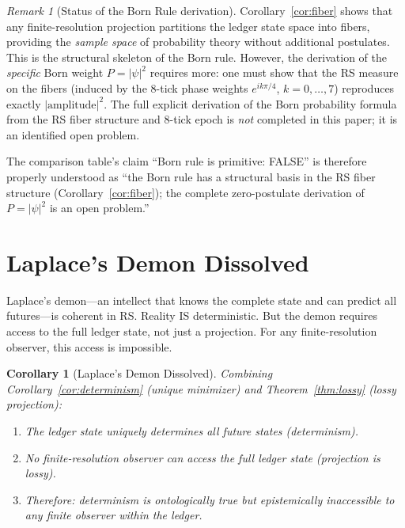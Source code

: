 \documentclass[12pt,a4paper]{article}
\newtheorem{corollary}[theorem]{Corollary}
\theoremstyle{definition}
\theoremstyle{remark}
\newtheorem{remark}[theorem]{Remark}
\begin{document}
\begin{remark}[Status of the Born Rule derivation]
\label{rem:born-status}
Corollary~\ref{cor:fiber} shows that any finite-resolution projection
partitions the ledger state space into fibers, providing the
\emph{sample space} of probability theory without additional postulates.
This is the structural skeleton of the Born rule.  However, the
derivation of the \emph{specific} Born weight $P = |\psi|^2$ requires
more: one must show that the RS measure on the fibers (induced by the
8-tick phase weights $e^{ik\pi/4}$, $k = 0,\ldots,7$) reproduces
exactly $|\text{amplitude}|^2$.  The full explicit derivation of the
Born probability formula from the RS fiber structure and 8-tick epoch is
\emph{not} completed in this paper; it is an identified open problem.

The comparison table's claim ``Born rule is primitive: FALSE'' is therefore
properly understood as ``the Born rule has a structural basis in the RS
fiber structure (Corollary~\ref{cor:fiber}); the complete zero-postulate
derivation of $P = |\psi|^2$ is an open problem.''
\end{remark}

\section{Laplace's Demon Dissolved}
\label{sec:laplace}

Laplace's demon---an intellect that knows the complete state and can
predict all futures---is coherent in RS.  Reality IS deterministic.  But
the demon requires access to the full ledger state, not just a projection.
For any finite-resolution observer, this access is impossible.

\begin{corollary}[Laplace's Demon Dissolved]
\label{thm:laplace}
Combining Corollary~\ref{cor:determinism} (unique minimizer) and
Theorem~\ref{thm:lossy} (lossy projection):
\begin{enumerate}[label=(\roman*)]
  \item The ledger state uniquely determines all future states
    (determinism).
  \item No finite-resolution observer can access the full ledger state
    (projection is lossy).
  \item Therefore: determinism is ontologically true but epistemically
    inaccessible to any finite observer within the ledger.
\end{enumerate}
\end{corollary}
\end{document}
